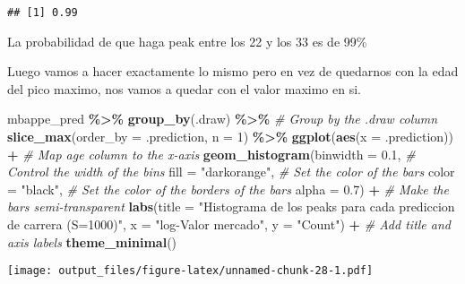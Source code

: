 \documentclass[
]{article}
\newenvironment{Shaded}{\begin{snugshade}}{\end{snugshade}}
\newcommand{\AttributeTok}[1]{\textcolor[rgb]{0.13,0.29,0.53}{#1}}
\newcommand{\CommentTok}[1]{\textcolor[rgb]{0.56,0.35,0.01}{\textit{#1}}}
\newcommand{\DecValTok}[1]{\textcolor[rgb]{0.00,0.00,0.81}{#1}}
\newcommand{\FloatTok}[1]{\textcolor[rgb]{0.00,0.00,0.81}{#1}}
\newcommand{\FunctionTok}[1]{\textcolor[rgb]{0.13,0.29,0.53}{\textbf{#1}}}
\newcommand{\NormalTok}[1]{#1}
\newcommand{\SpecialCharTok}[1]{\textcolor[rgb]{0.81,0.36,0.00}{\textbf{#1}}}
\newcommand{\StringTok}[1]{\textcolor[rgb]{0.31,0.60,0.02}{#1}}
\begin{document}
\begin{verbatim}
## [1] 0.99
\end{verbatim}

La probabilidad de que haga peak entre los 22 y los 33 es de 99\%

Luego vamos a hacer exactamente lo mismo pero en vez de quedarnos con la
edad del pico maximo, nos vamos a quedar con el valor maximo en si.

\begin{Shaded}
\begin{Highlighting}[]
\NormalTok{mbappe\_pred }\SpecialCharTok{\%\textgreater{}\%}
  \FunctionTok{group\_by}\NormalTok{(.draw) }\SpecialCharTok{\%\textgreater{}\%}               \CommentTok{\# Group by the .draw column}
  \FunctionTok{slice\_max}\NormalTok{(}\AttributeTok{order\_by =}\NormalTok{ .prediction, }\AttributeTok{n =} \DecValTok{1}\NormalTok{) }\SpecialCharTok{\%\textgreater{}\%}
    \FunctionTok{ggplot}\NormalTok{(}\FunctionTok{aes}\NormalTok{(}\AttributeTok{x =}\NormalTok{ .prediction)) }\SpecialCharTok{+}         \CommentTok{\# Map \textquotesingle{}age\textquotesingle{} column to the x{-}axis}
    \FunctionTok{geom\_histogram}\NormalTok{(}\AttributeTok{binwidth =} \FloatTok{0.1}\NormalTok{,     }\CommentTok{\# Control the width of the bins}
                 \AttributeTok{fill =} \StringTok{"darkorange"}\NormalTok{,    }\CommentTok{\# Set the color of the bars}
                 \AttributeTok{color =} \StringTok{"black"}\NormalTok{,  }\CommentTok{\# Set the color of the borders of the bars}
                 \AttributeTok{alpha =} \FloatTok{0.7}\NormalTok{) }\SpecialCharTok{+}    \CommentTok{\# Make the bars semi{-}transparent}
    \FunctionTok{labs}\NormalTok{(}\AttributeTok{title =} \StringTok{"Histograma de los peaks para cada prediccion de carrera (S=1000)"}\NormalTok{, }\AttributeTok{x =} \StringTok{"log{-}Valor mercado"}\NormalTok{, }\AttributeTok{y =} \StringTok{"Count"}\NormalTok{) }\SpecialCharTok{+} \CommentTok{\# Add title and axis labels}
    \FunctionTok{theme\_minimal}\NormalTok{() }
\end{Highlighting}
\end{Shaded}

\texttt{[image: output\_files/figure-latex/unnamed-chunk-28-1.pdf]}
\end{document}
